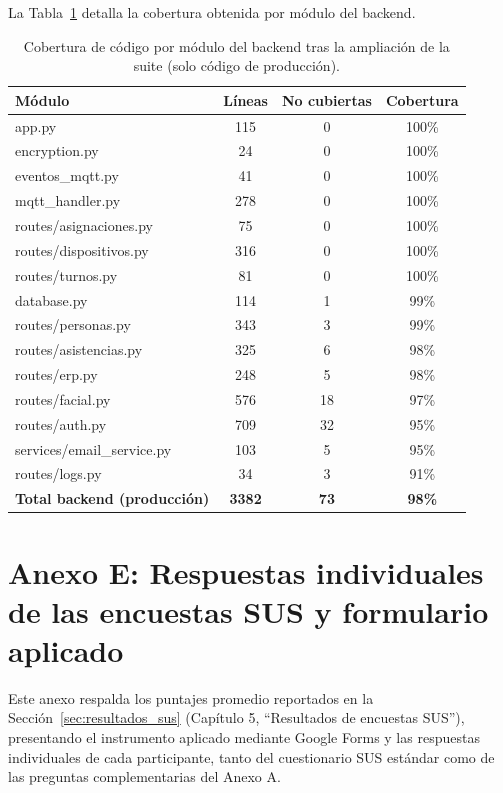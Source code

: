 \documentclass{iccmemoria}
\begin{document}
La Tabla~\ref{tab:anexoD_cobertura_modulos} detalla la cobertura obtenida por módulo del backend.

\begin{table}[H]
\centering
\begin{tabular}{|p{6.5cm}|c|c|c|}
\hline
\textbf{Módulo} & \textbf{Líneas} & \textbf{No cubiertas} & \textbf{Cobertura} \\
\hline
app.py & 115 & 0 & 100\% \\
\hline
encryption.py & 24 & 0 & 100\% \\
\hline
eventos\_mqtt.py & 41 & 0 & 100\% \\
\hline
mqtt\_handler.py & 278 & 0 & 100\% \\
\hline
routes/asignaciones.py & 75 & 0 & 100\% \\
\hline
routes/dispositivos.py & 316 & 0 & 100\% \\
\hline
routes/turnos.py & 81 & 0 & 100\% \\
\hline
database.py & 114 & 1 & 99\% \\
\hline
routes/personas.py & 343 & 3 & 99\% \\
\hline
routes/asistencias.py & 325 & 6 & 98\% \\
\hline
routes/erp.py & 248 & 5 & 98\% \\
\hline
routes/facial.py & 576 & 18 & 97\% \\
\hline
routes/auth.py & 709 & 32 & 95\% \\
\hline
services/email\_service.py & 103 & 5 & 95\% \\
\hline
routes/logs.py & 34 & 3 & 91\% \\
\hline
\multicolumn{1}{|l|}{\textbf{Total backend (producción)}} & \textbf{3382} & \textbf{73} & \textbf{98\%} \\
\hline
\end{tabular}
\caption{Cobertura de código por módulo del backend tras la ampliación de la suite (solo código de producción).}
\label{tab:anexoD_cobertura_modulos}
\end{table}



\chapter*{Anexo E: Respuestas individuales de las encuestas SUS y formulario aplicado}

Este anexo respalda los puntajes promedio reportados en la Sección~\ref{sec:resultados_sus} (Capítulo 5, ``Resultados de encuestas SUS''), presentando el instrumento aplicado mediante Google Forms y las respuestas individuales de cada participante, tanto del cuestionario SUS estándar como de las preguntas complementarias del Anexo A.
\end{document}
